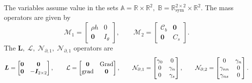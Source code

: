 The variables assume value in the sets $\mathbb{A} = \mathbb{R} \times \mathbb{R}^2, \; \mathbb{B} =\mathbb{R}^{2\times 2}_{\text{sym}} \times \mathbb{R}^2$. The mass operators are given by 
\begin{equation}
\mathcal{M}_1 = \begin{bmatrix}
\rho h & 0 \\
\bm{0} & I_\theta
\end{bmatrix}, \qquad 
\mathcal{M}_2 = \begin{bmatrix}
\bm{\mathcal{C}}_b & \bm{0} \\
\bm{0} & C_s
\end{bmatrix}.
\end{equation} 
The $\bm{L}, \; \mathcal{L}, \; \mathcal{N}_{\partial, 1}, \; \mathcal{N}_{\partial, 1}$ operators are 
\begin{equation}
\bm{L} = \begin{bmatrix}
\bm{0}  & \bm{0}  \\
\bm{0} & -\bm{I}_{2 \times 2} \\
\end{bmatrix}, \qquad
\mathcal{L} = \begin{bmatrix}
\bm{0} & \operatorname*{Grad}\\
\operatorname*{grad} & \bm{0}\\
\end{bmatrix}, \qquad
\mathcal{N}_{\partial, 1} = \begin{bmatrix}
\gamma_0 & 0 \\ 
0 & \gamma_n \\
0 & \gamma_s \\
\end{bmatrix}, \qquad 
\mathcal{N}_{\partial, 2} = \begin{bmatrix}
0 & \gamma_{n}  \\
\gamma_{nn} & 0 \\
\gamma_{ns} & 0\\
\end{bmatrix}.
\end{equation}


